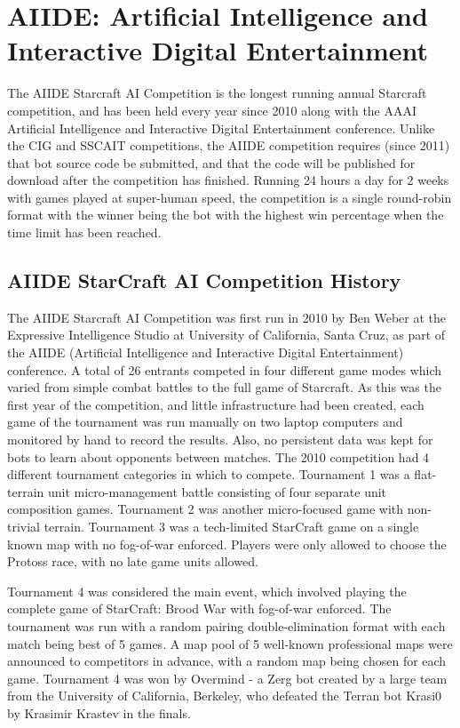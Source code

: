 \section{AIIDE: Artificial Intelligence and Interactive Digital Entertainment}\label{subsecAIIDE}

The AIIDE Starcraft AI Competition is the longest running annual Starcraft competition, and has been held every year since 2010 along with the AAAI Artificial Intelligence and Interactive Digital Entertainment conference. Unlike the CIG and SSCAIT competitions, the AIIDE competition requires (since 2011) that bot source code be submitted, and that the code will be published for download after the competition has finished. Running 24 hours a day for 2 weeks with games played at super-human speed, the competition is a single round-robin format with the winner being the bot with the highest win percentage when the time limit has been reached. 

\subsection{AIIDE StarCraft AI Competition History}

The AIIDE Starcraft AI Competition was first run in 2010 by Ben Weber at the Expressive Intelligence Studio at University of California, Santa Cruz, as part of the AIIDE (Artificial Intelligence and Interactive Digital Entertainment) conference. A total of 26 entrants competed in four different game modes which varied from simple combat battles to the full game of Starcraft. As this was the first year of the competition, and little infrastructure had been created, each game of the tournament was run manually on two laptop computers and monitored by hand to record the results. Also, no persistent data was kept for bots to learn about opponents between matches. The 2010 competition had 4 different tournament categories in which to compete. Tournament 1 was a flat-terrain unit micro-management battle consisting of four separate unit composition games. Tournament 2 was another micro-focused game with non-trivial terrain. Tournament 3 was a tech-limited StarCraft game on a single known map with no fog-of-war enforced. Players were only allowed to choose the Protoss race, with no late game units allowed. 

Tournament 4 was considered the main event, which involved playing the complete game of StarCraft: Brood War with fog-of-war enforced. The tournament was run with a random pairing double-elimination format with each match being best of 5 games. A map pool of 5 well-known professional maps were announced to competitors in advance, with a random map being chosen for each game. Tournament 4 was won by Overmind - a Zerg bot created by a large team from the University of California, Berkeley, who defeated the Terran bot Krasi0 by Krasimir Krastev in the finals.

